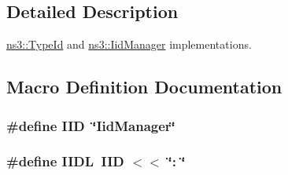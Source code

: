 \subsection{Detailed Description}
\hyperlink{classns3_1_1TypeId}{ns3\+::\+Type\+Id} and \hyperlink{classns3_1_1IidManager}{ns3\+::\+Iid\+Manager} implementations. 

\subsection{Macro Definition Documentation}
\subsubsection[{\texorpdfstring{I\+ID}{IID}}]{\setlength{\rightskip}{0pt plus 5cm}\#define I\+ID~\char`\"{}Iid\+Manager\char`\"{}}\hypertarget{type-id_8cc_a88c5717498eac8c8d6a06538e6c65d49}{}\label{type-id_8cc_a88c5717498eac8c8d6a06538e6c65d49}
\subsubsection[{\texorpdfstring{I\+I\+DL}{IIDL}}]{\setlength{\rightskip}{0pt plus 5cm}\#define I\+I\+DL~{\bf I\+ID} $<$$<$ \char`\"{}\+: \char`\"{}}\hypertarget{type-id_8cc_a3d266412e7a8a083ee1636faffe4ca8c}{}\label{type-id_8cc_a3d266412e7a8a083ee1636faffe4ca8c}
